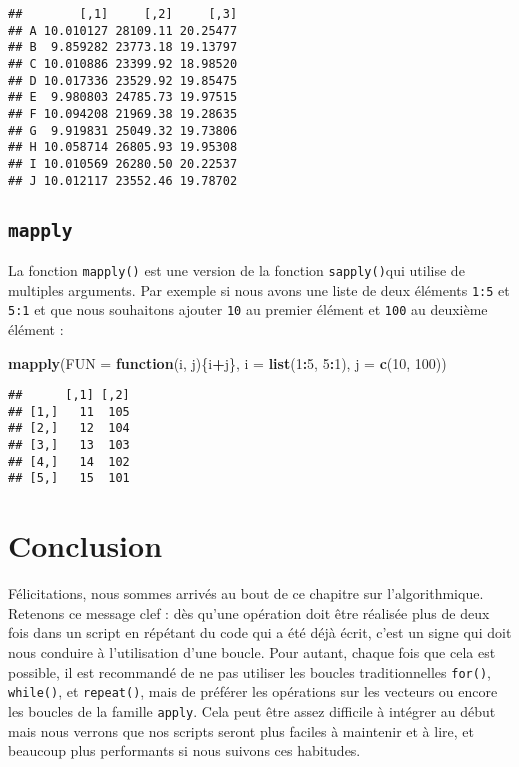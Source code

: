 \documentclass[]{book}
\newenvironment{Shaded}{\begin{snugshade}}{\end{snugshade}}
\newcommand{\KeywordTok}[1]{\textcolor[rgb]{0.13,0.29,0.53}{\textbf{#1}}}
\newcommand{\DataTypeTok}[1]{\textcolor[rgb]{0.13,0.29,0.53}{#1}}
\newcommand{\DecValTok}[1]{\textcolor[rgb]{0.00,0.00,0.81}{#1}}
\newcommand{\ControlFlowTok}[1]{\textcolor[rgb]{0.13,0.29,0.53}{\textbf{#1}}}
\newcommand{\OperatorTok}[1]{\textcolor[rgb]{0.81,0.36,0.00}{\textbf{#1}}}
\newcommand{\NormalTok}[1]{#1}
\theoremstyle{definition}
\theoremstyle{definition}
\theoremstyle{definition}
\theoremstyle{remark}
\begin{document}
\begin{verbatim}
##        [,1]     [,2]     [,3]
## A 10.010127 28109.11 20.25477
## B  9.859282 23773.18 19.13797
## C 10.010886 23399.92 18.98520
## D 10.017336 23529.92 19.85475
## E  9.980803 24785.73 19.97515
## F 10.094208 21969.38 19.28635
## G  9.919831 25049.32 19.73806
## H 10.058714 26805.93 19.95308
## I 10.010569 26280.50 20.22537
## J 10.012117 23552.46 19.78702
\end{verbatim}

\subsection{\texorpdfstring{\texttt{mapply}}{mapply}}\label{l17mapply}

La fonction \texttt{mapply()} est une version de la fonction
\texttt{sapply()}qui utilise de multiples arguments. Par exemple si nous
avons une liste de deux éléments \texttt{1:5} et \texttt{5:1} et que
nous souhaitons ajouter \texttt{10} au premier élément et \texttt{100}
au deuxième élément :

\begin{Shaded}
\begin{Highlighting}[]
\KeywordTok{mapply}\NormalTok{(}\DataTypeTok{FUN =} \ControlFlowTok{function}\NormalTok{(i, j)\{i}\OperatorTok{+}\NormalTok{j\}, }\DataTypeTok{i =} \KeywordTok{list}\NormalTok{(}\DecValTok{1}\OperatorTok{:}\DecValTok{5}\NormalTok{, }\DecValTok{5}\OperatorTok{:}\DecValTok{1}\NormalTok{), }\DataTypeTok{j =} \KeywordTok{c}\NormalTok{(}\DecValTok{10}\NormalTok{, }\DecValTok{100}\NormalTok{))}
\end{Highlighting}
\end{Shaded}

\begin{verbatim}
##      [,1] [,2]
## [1,]   11  105
## [2,]   12  104
## [3,]   13  103
## [4,]   14  102
## [5,]   15  101
\end{verbatim}

\section{Conclusion}\label{conclusion-6}

Félicitations, nous sommes arrivés au bout de ce chapitre sur
l'algorithmique. Retenons ce message clef : dès qu'une opération doit
être réalisée plus de deux fois dans un script en répétant du code qui a
été déjà écrit, c'est un signe qui doit nous conduire à l'utilisation
d'une boucle. Pour autant, chaque fois que cela est possible, il est
recommandé de ne pas utiliser les boucles traditionnelles
\texttt{for()}, \texttt{while()}, et \texttt{repeat()}, mais de préférer
les opérations sur les vecteurs ou encore les boucles de la famille
\texttt{apply}. Cela peut être assez difficile à intégrer au début mais
nous verrons que nos scripts seront plus faciles à maintenir et à lire,
et beaucoup plus performants si nous suivons ces habitudes.
\end{document}
